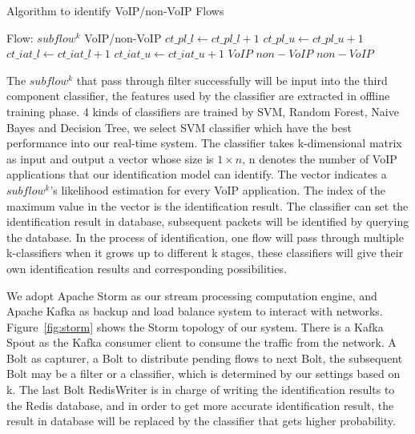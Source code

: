 \documentclass[conference]{IEEEtran}
\begin{document}
\begin{algorithm}[!h]
\caption{Algorithm to identify VoIP/non-VoIP Flows}
\label{algorithm:filter}
\begin{algorithmic}[1]
\REQUIRE Flow: $subflow^k$
\ENSURE VoIP/non-VoIP
       	\STATE $ct\_pl\_l \gets ct\_pl\_l +1$
       \ENDIF
       	\STATE $ct\_pl\_u \gets ct\_pl\_u+1$
       \ENDIF
       	\STATE $ct\_iat\_l  \gets ct\_iat\_l+1$
       \ENDIF
       	\STATE $ct\_iat\_u \gets ct\_iat\_u+1$
       \ENDIF
    \ENDFOR
        \RETURN $VoIP$
    \ELSE  \RETURN $non-VoIP$
   \ENDIF
\ELSE \RETURN $non-VoIP$
\ENDIF
\end{algorithmic}
\end{algorithm}

The $subflow^k$ that pass through filter successfully will be input into the third component classifier, the features used by the classifier are extracted in offline training phase. 4 kinds of classifiers are trained by SVM, Random Forest, Naive Bayes and Decision Tree, we select SVM classifier which have the best performance into our real-time system. The classifier takes k-dimensional matrix as input and output a vector whose size is $1 \times n$,  n denotes the number of VoIP applications that our identification model can identify. The vector indicates a $subflow^k$'s likelihood estimation for every VoIP application. The index of the maximum value in the vector is the identification result. The classifier can set the identification result in database, subsequent packets will be identified by querying the database. In the process of identification, one flow will pass through multiple k-classifiers when it grows up to different k stages, these classifiers will give their own identification results and corresponding possibilities.

We adopt Apache Storm as our stream processing computation engine, and Apache Kafka as backup and load balance system to interact with networks. Figure~\ref{fig:storm} shows the Storm topology of our system. There is a Kafka Spout as the Kafka consumer client to consume the traffic from the network. A Bolt as capturer, a Bolt to distribute pending flows to next Bolt, the subsequent Bolt may be a filter or a classifier, which is determined by our settings based on k. The last Bolt RedisWriter is in charge of writing the identification results to the Redis database, and in order to get more accurate identification result, the result in database will be replaced by the classifier that gets higher probability.
\end{document}
